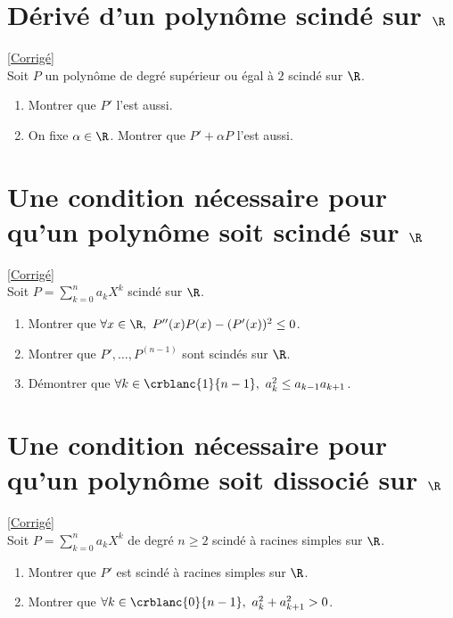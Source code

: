 \documentclass{book}
\begin{document}
	\section{Dérivé d'un polynôme scindé sur $\R$ }
	\textcolor{blue}{\hyperref[sec:dérivé-d'un-polynôme-scindé-sur-R]{[Corrigé]}}\\
	\label{Dérivé d'un polynôme scindé sur R}
	Soit $P$ un polynôme de degré supérieur ou égal à $2$ scindé sur $\R$.
	\begin{enumerate}
		\item Montrer que $P'$ l'est aussi.
		\item On fixe $\alpha\in \R$. Montrer que $P'+\alpha P$ l'est aussi.
	\end{enumerate}
	
	\section{Une condition nécessaire pour qu'un polynôme soit scindé sur $\R$ }
	\textcolor{blue}{\hyperref[sec:une-condition-nécessaire-pour-qu'un-polynôme-soit-scindé-sur-R]{[Corrigé]}}\\
	\label{Une condition nécessaire pour qu'un polynôme soit scindé sur R}
	Soit $P=\displaystyle\sum\limits_{k=0}^n{a_kX^k}$ scindé sur $\R$.
	\begin{enumerate}
		\item Montrer que $\forall x\in \R,\ P''(x)P(x)-(P'(x))^2\leq 0$.
		\item Montrer que $P',\dots ,P^{(n-1)}$ sont scindés sur $\R$.
		\item Démontrer que $\forall k\in \crblanc{1}{n-1},\ a_k^2\leq a_{k-1}a_{k+1}$.
	\end{enumerate}
	
	\section{Une condition nécessaire pour qu'un polynôme soit dissocié sur $\R$ }
	\textcolor{blue}{\hyperref[sec:une-condition-nécessaire-pour-qu'un-polynôme-soit-dissocié-sur-R]{[Corrigé]}}\\
	\label{Une condition nécessaire pour qu'un polynôme soit dissocié sur R}
	Soit $P=\displaystyle\sum_{k=0}^na_kX^k$ de degré $n\geq 2$ scindé à racines simples sur $\R$.
	\begin{enumerate}
		\item Montrer que $P'$ est scindé à racines simples sur $\R$.
		\item Montrer que $\forall k\in \crblanc{0}{n-1},\ a_k^2+a_{k+1}^2>0$.
	\end{enumerate}
	
\end{document}
